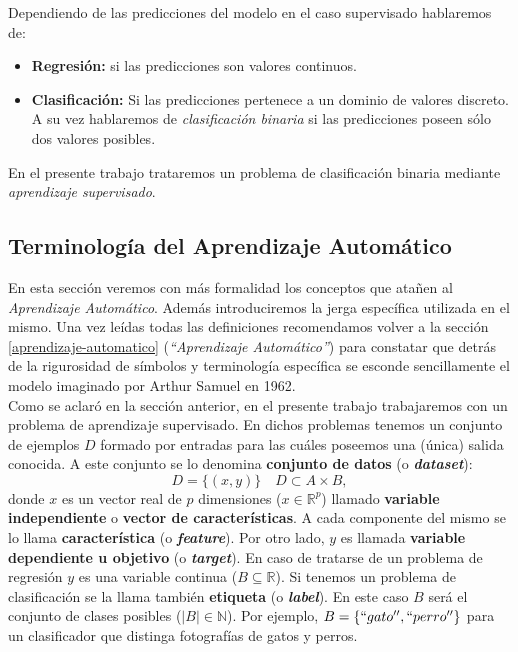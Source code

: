 Dependiendo de las predicciones del modelo en el caso supervisado hablaremos de:
\begin{itemize}
    \item \textbf{Regresión:} si las predicciones son valores continuos.
    \item \textbf{Clasificación:} Si las predicciones pertenece a un dominio de valores discreto.
    A su vez hablaremos de \textit{clasificación binaria} si las predicciones poseen sólo dos valores posibles.
\end{itemize}

En el presente trabajo trataremos un problema de clasificación binaria mediante \textit{aprendizaje supervisado}.

\subsection{Terminología del Aprendizaje Automático}

En esta sección veremos con más formalidad los conceptos que atañen al \textit{Aprendizaje Automático}. Además introduciremos la jerga específica utilizada en el mismo. Una vez leídas todas las definiciones recomendamos volver a la sección \ref{aprendizaje-automatico} (\textit{``Aprendizaje Automático''}) para constatar que detrás de la rigurosidad de símbolos y terminología específica se esconde sencillamente el modelo imaginado por Arthur Samuel en 1962. \cite{ensayo-samuel} \\

Como se aclaró en la sección anterior, en el presente trabajo trabajaremos con un problema de aprendizaje supervisado. En dichos problemas tenemos un conjunto de ejemplos $D$ formado por entradas para las cuáles poseemos una (única) salida conocida. A este conjunto se lo denomina \textbf{conjunto de datos} (o \textbf{\textit{dataset}}):
\begin{equation*}
    D = \{ (x, y) \} \quad D \subset A \times B,
\end{equation*}
donde $x$ es un vector real de $p$ dimensiones ($x \in \mathbb{R}^p$) llamado \textbf{variable independiente} o  \textbf{vector  de características}. A cada componente del mismo se lo llama \textbf{característica} (o \textit{\textbf{feature}}).
Por otro lado, $y$ es llamada \textbf{variable dependiente u objetivo} (o \textit{\textbf{target}}). En caso de tratarse de un problema de regresión $y$ es una variable continua ($B \subseteq \mathbb{R} $). Si tenemos un problema de clasificación se la llama también \textbf{etiqueta} (o \textit{\textbf{label}}). En este caso $B$ será el conjunto de clases posibles ($|B| \in \mathbb{N} $). Por ejemplo, $B = \{``gato'', ``perro''\}$ para un clasificador que distinga fotografías de gatos y perros. \\
    
